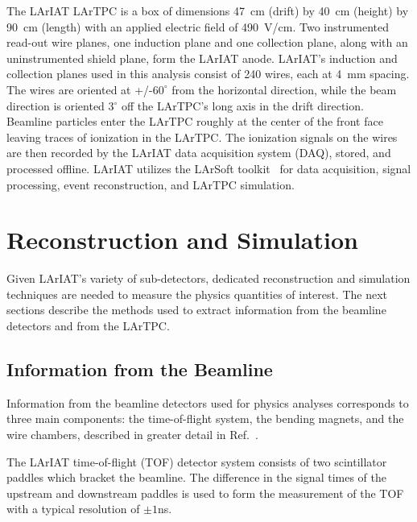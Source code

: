 \documentclass[%
 floatfix,
 reprint,
 twocolumn,
superscriptaddress,
showpacs,preprintnumbers,
 amsmath,amssymb,
 aps,
prd,
]{revtex4-1}
\begin{document}
The LArIAT LArTPC is a box of dimensions 47~cm (drift) by 40~cm (height) by 90~cm (length) with an applied electric field of 490~V/cm. Two instrumented read-out wire planes, one induction plane and one collection plane, along with an uninstrumented shield plane, form the LArIAT anode. LArIAT's induction and collection planes used in this analysis consist of 240 wires, each at 4~mm spacing. The wires are oriented at +/-$60^{\circ}$ from the horizontal direction, while the beam direction is oriented 3$^\circ$ off the LArTPC's long axis in the drift direction. Beamline particles enter the LArTPC roughly at the center of the front face leaving traces of ionization in the LArTPC. The ionization signals on the wires are then recorded by the LArIAT data acquisition system (DAQ), stored, and processed offline. LArIAT utilizes the LArSoft toolkit~\cite{LArSoft} for data acquisition, signal processing, event reconstruction, and LArTPC simulation. 

\section{Reconstruction and Simulation}



Given LArIAT's variety of sub-detectors, dedicated reconstruction and simulation techniques are needed to measure the physics quantities of interest. The next sections describe the methods used to extract information from the beamline detectors and from the LArTPC.


\subsection{\label{sec:BeamlineReco}Information from the Beamline}
Information from the beamline detectors used for physics analyses corresponds to three main components: the time-of-flight system, the bending magnets, and the wire chambers, described in greater detail in Ref.~\cite{Acciarri_2020}. 

The LArIAT time-of-flight (TOF) detector system consists of two scintillator paddles which bracket the beamline. The difference in the signal times of the upstream and downstream paddles is used to form the measurement of the TOF with a typical resolution of $\pm 1$ns. 
\end{document}

